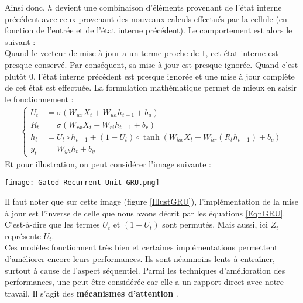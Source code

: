 Ainsi donc, $ h $ devient une combinaison d'éléments provenant de l'état interne précédent avec ceux provenant des nouveaux calculs effectués par la cellule (en fonction de l'entrée et de l'état interne précédent). Le comportement est alors le suivant :\\
Quand le vecteur de mise à jour a un terme proche de $ 1 $, cet état interne est presque conservé. Par conséquent, sa mise à jour est presque ignorée. Quand c'est plutôt $ 0 $, l'état interne précédent est presque ignorée et une mise à jour complète de cet état est effectuée. La formulation mathématique permet de mieux en saisir le fonctionnement \cite{geron2020deep,ganegedara2018natural} :
\begin{eqnarray}\label{EqnGRU}
\begin{cases}
U_{t} &= \sigma\left( W_{ux}X_{t}+W_{uh}h_{t-1}+b_{u} \right)\\
R_{t} &= \sigma\left( W_{rx}X_{t}+W_{ri}h_{t-1}+b_{r} \right)\\
h_{t} &= U_{t}\circ h_{t-1} + \left( 1-U_{t}\right)\circ \tanh\left( W_{hx}X_{t}+W_{hr}\left(R_{t} h_{t-1}\right) +b_{c} \right)\\
y_{t} &= W_{yh}h_{t}+b_{y}
\end{cases}
\end{eqnarray}
Et pour illustration, on peut considérer l'image suivante :
\begin{center}
\texttt{[image: Gated-Recurrent-Unit-GRU.png]}
\label{IllustGRU}
\end{center}
Il faut noter que sur cette image (figure \ref{IllustGRU}), l'implémentation de la mise à jour est l'inverse de celle que nous avons décrit par les équations \ref{EqnGRU}. C'est-à-dire que les termes $ U_{t} $ et $ \left( 1-U_{t}\right) $ sont permutés. Mais aussi, ici $ Z_{t} $ représente $ U_{t} $.\\

Ces modèles fonctionnent très bien et certaines implémentations permettent d'améliorer encore leurs performances. Ils sont néanmoins lents à entraîner, surtout à cause de l'aspect séquentiel. Parmi les techniques d'amélioration des performances, une peut être considérée car elle a un rapport direct avec notre travail. Il s'agit des \textbf{mécanismes d'attention} \cite{bahdanau2014neural}.\\
